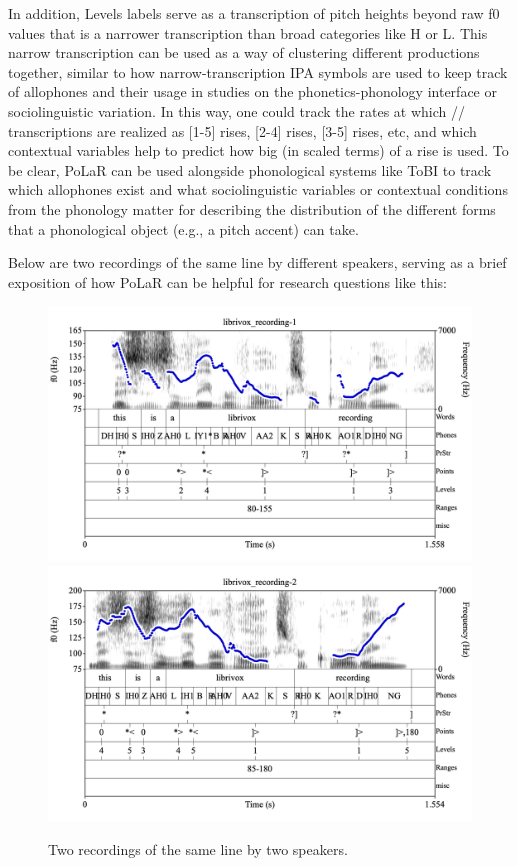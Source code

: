 \documentclass[11pt, twoside]{memoir}
\def\textlabel#1{{\relsize{-.5}\fontspec[Mapping=tex-text]{Roboto Mono}{#1}}}
\begin{document}
In addition, Levels labels serve as a transcription of pitch heights beyond raw f0 values that is a narrower transcription than broad categories like H or L. This narrow transcription can be used as a way of clustering different productions together, similar to how narrow-transcription IPA symbols are used to keep track of allophones and their usage in studies on the phonetics-phonology interface or sociolinguistic variation. In this way, one could track the rates at which /\textlabel{L+H*}/ transcriptions are realized as [1-5] rises, [2-4] rises, [3-5] rises, etc, and which contextual variables help to predict how big (in scaled terms) of a rise is used. To be clear, PoLaR can be used alongside phonological systems like ToBI to track which allophones exist and what sociolinguistic variables or contextual conditions from the phonology matter for describing the distribution of the different forms that a phonological object (e.g., a pitch accent) can take.

Below are two recordings of the same line by different speakers, serving as a brief exposition of how PoLaR can be helpful for research questions like this:

\begin{figure}[H]
\centering
%
\includegraphics[width=.485\linewidth]{Usages-librivox_recording-1.png} \includegraphics[width=.485\linewidth]{Usages-librivox_recording-2.png}
%
\caption{Two recordings of the same line by two speakers.%
\label{fig:Usages-librivox recording}%
}
\end{figure}
\end{document}
